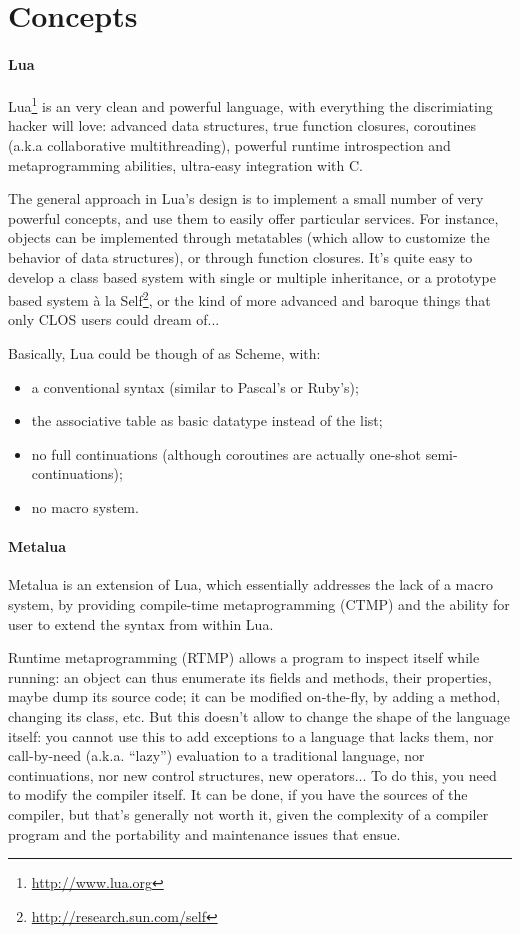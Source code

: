 \section{Concepts}

\paragraph{Lua}
Lua\footnote{\url{http://www.lua.org}} is an very clean and powerful
language, with everything the discrimiating hacker will love: advanced
data structures, true function closures, coroutines (a.k.a collaborative
multithreading), powerful runtime introspection and metaprogramming
abilities, ultra-easy integration with C.

The general approach in Lua's design is to implement a small number of
very powerful concepts, and use them to easily offer particular
services. For instance, objects can be implemented through metatables
(which allow to customize the behavior of data structures), or through
function closures. It's quite easy to develop a class based system
with single or multiple inheritance, or a prototype based system 
{\`a la} Self\footnote{\url{http://research.sun.com/self}}, or
the kind of more advanced and baroque things that only CLOS users
could dream of...

Basically, Lua could be though of as Scheme, with:
\begin{itemize}
\item a conventional syntax (similar to Pascal's or Ruby's);
\item the associative table as basic datatype instead of the list;
\item no full continuations (although coroutines are actually one-shot
  semi-continuations);
\item no macro system.
\end{itemize}

\paragraph{Metalua}
Metalua is an extension of Lua, which essentially addresses the lack
of a macro system, by providing compile-time metaprogramming (CTMP)
and the ability for user to extend the syntax from within Lua.

Runtime metaprogramming (RTMP) allows a program to inspect itself
while running: an object can thus enumerate its fields and methods,
their properties, maybe dump its source code; it can be modified
on-the-fly, by adding a method, changing its class, etc. But this
doesn't allow to change the shape of the language itself: you cannot
use this to add exceptions to a language that lacks them, nor
call-by-need (a.k.a. ``lazy'') evaluation to a traditional language,
nor continuations, nor new control structures, new operators... To do
this, you need to modify the compiler itself. It can be done, if you
have the sources of the compiler, but that's generally not worth it,
given the complexity of a compiler program and the portability and
maintenance issues that ensue.


